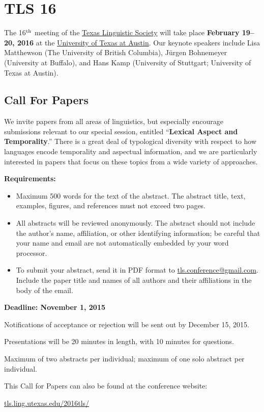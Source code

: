 \documentclass[11pt]{article}
\begin{document}
\clearpage\thispagestyle{empty}

\section*{TLS 16}

The 16$^{\rm th}$ meeting of the \href{http://tls.ling.utexas.edu}{Texas Linguistic Society} will take place \textbf{February 19--20, 2016} at the \href{https://www.utexas.edu/cola/depts/linguistics/}{University of Texas at Austin}. Our keynote speakers include Lisa Matthewson (The University of British Columbia), J{\"u}rgen Bohnemeyer (University at Buffalo), and Hans Kamp (University of Stuttgart; University of Texas at Austin).

\subsection*{Call For Papers}

We invite papers from all areas of linguistics, but especially encourage submissions relevant to our special session, entitled ``\textbf{Lexical Aspect and Temporality}.'' There is a great deal of typological diversity with respect to how languages encode temporality and aspectual information, and we are particularly interested in papers that focus on these topics from a wide variety of approaches.

\bigskip\noindent
\textbf{Requirements:}

\begin{itemize}
  \setlength{\itemsep}{2pt}
  \setlength{\parskip}{2pt}
  \item Maximum 500 words for the text of the abstract. The abstract title, text, examples, figures, and references must not exceed two pages.
  \item All abstracts will be reviewed anonymously. The abstract should not include the author’s name, affiliation, or other identifying information; be careful that your name and email are not automatically embedded by your word processor.
  \item To submit your abstract, send it in PDF format to \href{mailto:tls.conference@gmail.com}{tls.conference@gmail.com}. Include the paper title and names of all authors and their affiliations in the body of the email.
\end{itemize}

\textbf{Deadline: November 1, 2015}

\bigskip\noindent
Notifications of acceptance or rejection will be sent out by December 15, 2015.

\medskip\noindent
Presentations will be 20 minutes in length, with 10 minutes for questions.

\medskip\noindent
Maximum of two abstracts per individual; maximum of one solo abstract per individual.

\medskip\noindent
This Call for Papers can also be found at the conference website:

\medskip
\url{tls.ling.utexas.edu/2016tls/}
\end{document}
